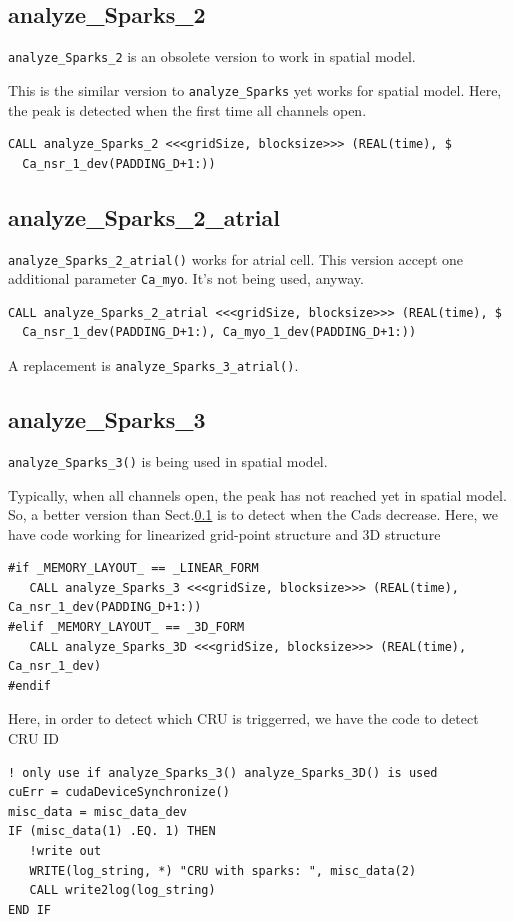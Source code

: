 \subsection{analyze\_Sparks\_2}
\label{sec:analyze_Sparks_2}

\verb!analyze_Sparks_2! is an obsolete version to work in spatial model.

This is the similar version to \verb!analyze_Sparks! yet works for spatial
model. Here, the peak is detected when the first time all channels open.
\begin{verbatim}
CALL analyze_Sparks_2 <<<gridSize, blocksize>>> (REAL(time), $
  Ca_nsr_1_dev(PADDING_D+1:))
\end{verbatim}

\subsection{analyze\_Sparks\_2\_atrial}

\verb!analyze_Sparks_2_atrial()! works for atrial cell. This version accept one
additional parameter \verb!Ca_myo!. It's not being used, anyway.
\begin{verbatim}
CALL analyze_Sparks_2_atrial <<<gridSize, blocksize>>> (REAL(time), $
  Ca_nsr_1_dev(PADDING_D+1:), Ca_myo_1_dev(PADDING_D+1:))
\end{verbatim}
A replacement is \verb!analyze_Sparks_3_atrial()!.

\subsection{analyze\_Sparks\_3}

\verb!analyze_Sparks_3()! is being used in spatial model.

Typically, when all channels open, the peak has not reached yet in spatial
model. So, a better version than Sect.\ref{sec:analyze_Sparks_2} is to detect
when the Cads decrease. Here, we have code working for linearized grid-point
structure and 3D structure
\begin{verbatim}
#if _MEMORY_LAYOUT_ == _LINEAR_FORM
   CALL analyze_Sparks_3 <<<gridSize, blocksize>>> (REAL(time), Ca_nsr_1_dev(PADDING_D+1:))
#elif _MEMORY_LAYOUT_ == _3D_FORM
   CALL analyze_Sparks_3D <<<gridSize, blocksize>>> (REAL(time), Ca_nsr_1_dev)
#endif
\end{verbatim}
Here, in order to detect which CRU is triggerred, we have the code to detect CRU
ID
\begin{verbatim}
! only use if analyze_Sparks_3() analyze_Sparks_3D() is used
cuErr = cudaDeviceSynchronize()
misc_data = misc_data_dev
IF (misc_data(1) .EQ. 1) THEN
   !write out
   WRITE(log_string, *) "CRU with sparks: ", misc_data(2)
   CALL write2log(log_string)
END IF
\end{verbatim}


